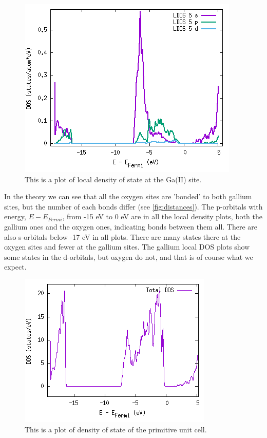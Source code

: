 \begin{figure}[H]
\includegraphics[width=\linewidth]{../fig/dosplot/ldos_Ga_II}\caption{This is a plot of local density of state at the Ga(II) site.}\label{fig:ldos_Ga_II}
\end{figure}

In the theory we can see that all the oxygen sites are 'bonded' to both gallium sites, but the number of each bonds differ (see \ref{fig:distances}). The p-orbitals with energy, $E-E_{Fermi}$, from -15 eV to 0 eV are in all the local density plots, both the gallium ones and the oxygen ones, indicating bonds between them all. There are also s-orbitals below -17 eV in all plots. There are many states there at the oxygen sites and fewer at the gallium sites. The gallium local DOS plots show some states in the d-orbitals, but oxygen do not, and that is of course what we expect.

\begin{figure}[H]
\includegraphics[width=\linewidth]{../fig/dosplot/total_dos_primitive_unitcell}\caption{This is a plot of density of state of the primitive unit cell.}\label{fig:total_dos_primitive}
\end{figure}

